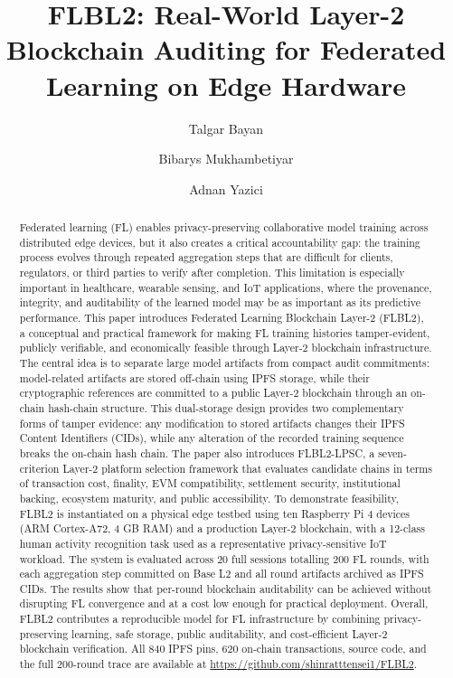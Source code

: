 \documentclass{llncs}
\begin{document}
\title{FLBL2: Real-World Layer-2 Blockchain Auditing for Federated Learning on Edge Hardware}

\author{Talgar Bayan \and Bibarys Mukhambetiyar  \and Adnan Yazici}



\maketitle

\begin{abstract}
Federated learning (FL) enables privacy-preserving collaborative model training across distributed edge devices, but it also creates a critical accountability gap: the training process evolves through repeated aggregation steps that are difficult for clients, regulators, or third parties to verify after completion. This limitation is especially important in healthcare, wearable sensing, and IoT applications, where the provenance, integrity, and auditability of the learned model may be as important as its predictive performance. This paper introduces Federated Learning Blockchain Layer-2 (FLBL2), a conceptual and practical framework for making FL training histories tamper-evident, publicly verifiable, and economically feasible through Layer-2 blockchain infrastructure. The central idea is to separate large model artifacts from compact audit commitments: model-related artifacts are stored off-chain using IPFS storage, while their cryptographic references are committed to a public Layer-2 blockchain through an on-chain hash-chain structure. This dual-storage design provides two complementary forms of tamper evidence: any modification to stored artifacts changes their IPFS Content Identifiers (CIDs), while any alteration of the recorded training sequence breaks the on-chain hash chain. The paper also introduces FLBL2-LPSC, a seven-criterion Layer-2 platform selection framework that evaluates candidate chains in terms of transaction cost, finality, EVM compatibility, settlement security, institutional backing, ecosystem maturity, and public accessibility. To demonstrate feasibility, FLBL2 is instantiated on a physical edge testbed using ten Raspberry Pi 4 devices (ARM Cortex-A72, 4 GB RAM) and a production Layer-2 blockchain, with a 12-class human activity recognition task used as a representative privacy-sensitive IoT workload. The system is evaluated across 20 full sessions totalling 200 FL rounds, with each aggregation step committed on Base L2 and all round artifacts archived as IPFS CIDs. The results show that per-round blockchain auditability can be achieved without disrupting FL convergence and at a cost low enough for practical deployment. Overall, FLBL2 contributes a reproducible model for FL infrastructure by combining privacy-preserving learning, safe storage, public auditability, and cost-efficient Layer-2 blockchain verification. All 840 IPFS pins, 620 on-chain transactions, source code, and the full 200-round trace are available at \url{https://github.com/shinratttensei1/FLBL2}.
\end{abstract}
\end{document}
